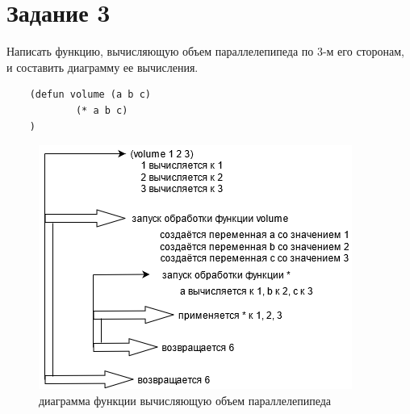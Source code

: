 \documentclass[a4paper, 12pt]{article}
\begin{document}
\section*{Задание 3}
Написать функцию, вычисляющую объем параллелепипеда по 3-м его сторонам,  и составить диаграмму ее вычисления.
\begin{lstlisting}
	(defun volume (a b c)
			(* a b c)
	)
\end{lstlisting}
\clearpage
\newpage
\begin{figure}[h!]
	\centering \includegraphics[scale=0.8]{vol}
	\centering\caption{диаграмма функции вычисляющую объем параллелепипеда}
\end{figure}
\end{document}
